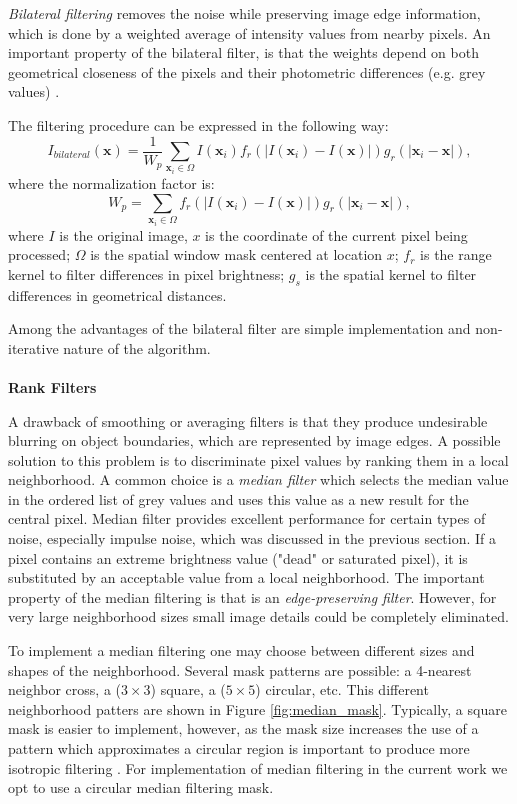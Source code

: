 \textit{Bilateral filtering} removes the noise while preserving image
edge information, which is done by a weighted average of intensity values from nearby pixels.
An important property of the bilateral filter, is that the weights depend on both geometrical closeness of the pixels and their photometric differences (e.g. grey values) \cite{Tomasi98}.

The filtering procedure can be expressed in the following way:
$$I_{bilateral}(\textbf{x}) = \frac{1}{W_p} \sum_{\textbf{x}_i \in \Omega} I(\textbf{x}_i) f_r(|I(\textbf{x}_i) - I(\textbf{x})|) g_r(|\textbf{x}_i - \textbf{x}|),$$
where the normalization factor is:
$$W_p = \sum_{\textbf{x}_i \in \Omega} f_r(|I(\textbf{x}_i) - I(\textbf{x})|) g_r(|\textbf{x}_i - \textbf{x}|),$$
where $I$ is the original image, $x$ is the coordinate of the current pixel being processed; $\Omega$ is the spatial window mask centered at location $x$; $f_r$ is the range kernel to filter differences in pixel brightness; $g_s$ is the spatial kernel to filter differences in geometrical distances. 

Among the advantages of the bilateral filter are simple implementation and non-iterative nature of the algorithm.
\\
\\
\textbf{Rank Filters}

A drawback of smoothing or averaging filters is that they produce undesirable blurring on object boundaries, which are represented by image edges. A possible solution to this problem is to discriminate pixel values by ranking them in a local neighborhood. A common choice is a \textit{median filter} which selects the median value in the ordered list of grey values and uses this value as a new result for the central pixel.  
Median filter provides excellent performance for certain types of noise, especially impulse noise, which was discussed in the previous section. If a pixel contains an extreme brightness value ("dead" or saturated pixel), it is substituted by an acceptable value from a local neighborhood.
The important property of the median filtering is that is an \textit{edge-preserving filter}. However, for very large neighborhood sizes small image details could be completely eliminated.  

To implement a median filtering one may choose between different  sizes and shapes of the neighborhood. Several mask patterns are possible: a 4-nearest neighbor cross, a ($3 \times 3 $) square,  a ($5 \times 5 $) circular, etc. This different neighborhood patters are shown in Figure \ref{fig:median_mask}. Typically, a square mask is easier to implement, however, as the mask size increases the use of a pattern which approximates a circular region is important to produce more isotropic filtering \cite{Russ11}. For implementation of median filtering in the current work we opt to use a circular median filtering mask. 


